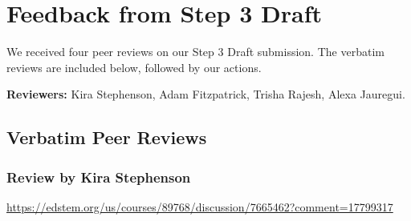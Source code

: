 \documentclass[11pt]{article}
\begin{document}
\section*{Feedback from Step 3 Draft}

We received four peer reviews on our Step 3 Draft submission. The verbatim reviews are included below, followed by our actions.

\textbf{Reviewers:} Kira Stephenson, Adam Fitzpatrick, Trisha Rajesh, Alexa Jauregui.

\subsection*{Verbatim Peer Reviews}

\subsubsection*{Review by Kira Stephenson}
\url{https://edstem.org/us/courses/89768/discussion/7665462?comment=17799317}
\end{document}
